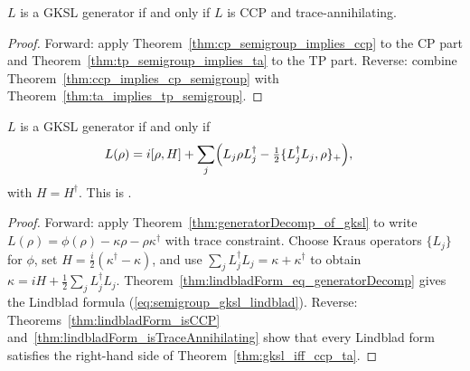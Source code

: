 \begin{theorem}
    \label{thm:gksl_iff_ccp_ta}
    \leanok
    $L$ is a GKSL generator if and only if $L$ is CCP and
    trace-annihilating.
\end{theorem}

\begin{proof}\leanok
    Forward: apply Theorem~\ref{thm:cp_semigroup_implies_ccp} to the CP part and
    Theorem~\ref{thm:tp_semigroup_implies_ta} to the TP part.
    Reverse: combine Theorem~\ref{thm:ccp_implies_cp_semigroup} with
    Theorem~\ref{thm:ta_implies_tp_semigroup}.
\end{proof}

\begin{theorem}
    \label{thm:gksl_iff_lindblad}
    \leanok
    $L$ is a GKSL generator if and only if
    \begin{align}
        L(\rho)
        &= i[\rho,H]
        + \sum_j \Bigl(        L_j\rho L_j^\dagger
            - \tfrac{1}{2}\{L_j^\dagger L_j,\rho\}_+
        \Bigr),
        \label{eq:semigroup_gksl_lindblad}
    \end{align}
    with $H=H^\dagger$.
    This is \cite[Theorem~7.1]{Wolf2012Quantum}.
\end{theorem}

\begin{proof}\leanok
    Forward: apply Theorem~\ref{thm:generatorDecomp_of_gksl} to write
    $L(\rho)=\phi(\rho)-\kappa\rho-\rho\kappa^\dagger$ with trace
    constraint. Choose Kraus operators $\{L_j\}$ for $\phi$, set
    $H=\frac{i}{2}(\kappa^\dagger-\kappa)$, and use
    $\sum_jL_j^\dagger L_j=\kappa+\kappa^\dagger$ to obtain
    $\kappa=iH+\frac{1}{2}\sum_jL_j^\dagger L_j$.
    Theorem~\ref{thm:lindbladForm_eq_generatorDecomp} gives the Lindblad
    formula (\ref{eq:semigroup_gksl_lindblad}).
    Reverse: Theorems~\ref{thm:lindbladForm_isCCP}
    and~\ref{thm:lindbladForm_isTraceAnnihilating} show that every Lindblad form
    satisfies the right-hand side of Theorem~\ref{thm:gksl_iff_ccp_ta}.
\end{proof}

